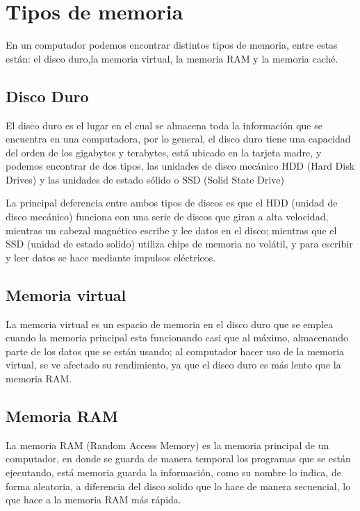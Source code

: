\documentclass{article}
\begin{document}
\section{Tipos de memoria} \label{contenido}
En un computador podemos encontrar distintos tipos de memoria, entre estas están: el disco duro,la memoria virtual, la memoria RAM y la memoria caché.

\subsection{Disco Duro}
El disco duro es el lugar en el cual se almacena toda la información que se encuentra en una computadora, por lo general, el disco duro tiene una capacidad del orden de los gigabytes y terabytes, está ubicado en la tarjeta madre, y podemos encontrar de dos tipos, las unidades de disco mecánico HDD (Hard Disk Drives) y las unidades de estado sólido o SSD (Solid State Drive)
\vspace{0.5cm}

La principal deferencia entre ambos tipos de discos es que el HDD (unidad de disco mecánico) funciona con una serie de discos que giran a alta velocidad, mientras un cabezal magnético escribe y lee datos en el disco\cite{andres2017cual}; mientras que el SSD (unidad de estado solido) utiliza chips de memoria no volátil, y para escribir y leer datos se hace mediante impulsos eléctricos.\cite{andres2017cual}

\subsection{Memoria virtual}
La memoria virtual es un espacio de memoria en el disco duro que se emplea cuando la memoria principal esta funcionando casi que al máximo, almacenando parte de los datos que se están usando; al computador hacer uso de la memoria virtual, se ve afectado su rendimiento, ya que el disco duro es más lento que la memoria RAM.\cite{rebollo2011memoria}

\subsection{Memoria RAM}
La memoria RAM (Random Access Memory) es la memoria principal de un computador, en donde se guarda de manera temporal los programas que se están ejecutando, está memoria  guarda la información, como su nombre lo indica, de forma aleatoria, a diferencia del disco solido que lo hace de manera secuencial, lo que hace a la memoria RAM más rápida.\cite{rebollo2011memoria}
\end{document}
